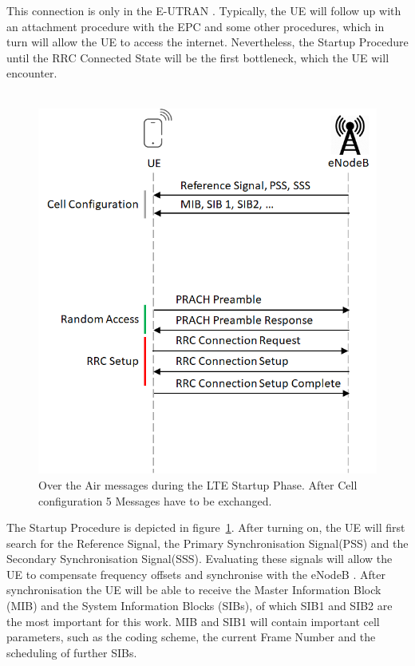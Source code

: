 \documentclass[conference]{IEEEtran}
\begin{document}
This connection is only in the E-UTRAN .
Typically, the UE will follow up with an attachment procedure with the EPC and some other procedures, which in turn will allow the UE to access the internet.
Nevertheless, the Startup Procedure until the RRC Connected State will be the first bottleneck, which the UE will encounter.\\\\
\begin{figure}
    \centering
    \includegraphics[width= \columnwidth]{../Figures/OtA_LTE_Startup}
    \caption{Over the Air messages during the LTE Startup Phase. After Cell configuration 5 Messages have to be exchanged.}
    \label{fig:OtA_LTE_Startup}
\end{figure}
The Startup Procedure is depicted in figure~\ref{fig:OtA_LTE_Startup}.
After turning on, the UE will first search for the Reference Signal, the Primary Synchronisation Signal(PSS) and the Secondary Synchronisation Signal(SSS).
Evaluating these signals will allow the UE to compensate frequency offsets and synchronise with the eNodeB .
After synchronisation the UE will be able to receive the Master Information Block (MIB) and the System Information Blocks (SIBs), of which SIB1 and SIB2 are the most important for this work.
MIB and SIB1 will contain important cell parameters, such as the coding scheme, the current Frame Number and the scheduling of further SIBs.\\\\
\end{document}
